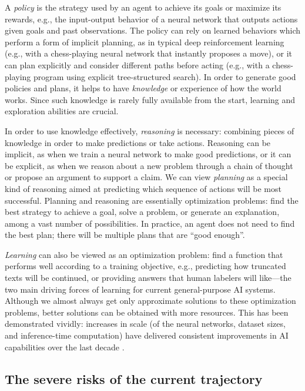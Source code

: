 A \textit{policy} is the strategy used by an agent to achieve its goals or maximize its rewards, e.g., the input-output behavior of a neural network that outputs actions given goals and past observations. The policy can rely on learned behaviors which perform a form of implicit planning, as in typical deep reinforcement learning \cite{mitpress.mit.edu.9780262039246.reinforcement.learning} (e.g., with a chess-playing neural network that instantly proposes a move), or it can plan explicitly and consider different paths before acting \cite{aima.cs.berkeley.edu} (e.g., with a chess-playing program using explicit tree-structured search). In order to generate good policies and plans, it helps to have \emph{knowledge} or experience of how the world works. Since such knowledge is rarely fully available from the start, learning and exploration abilities are crucial.

In order to use knowledge effectively, \emph{reasoning} is necessary: combining pieces of knowledge in order to make predictions or take actions. Reasoning can be implicit, as when we train a neural network to make good predictions, or it can be explicit, as when we reason about a new problem through a chain of thought or propose an argument to support a claim. We can view \textit{planning} as a special kind of reasoning aimed at predicting which sequence of actions will be most successful. Planning and reasoning are essentially optimization problems: find the best strategy to achieve a goal, solve a problem, or generate an explanation, among a vast number of possibilities. In practice, an agent does not need to find the best plan; there will be multiple plans that are ``good enough''.

\textit{Learning} can also be viewed as an optimization problem: find a function that performs well according to a training objective, e.g., predicting how truncated texts will be continued, or providing answers that human labelers will like---the two main driving forces of learning for current general-purpose AI systems. Although we almost always get only approximate solutions to these optimization problems, better solutions can be obtained with more resources. This has been demonstrated vividly: increases in scale (of the neural networks, dataset sizes, and inference-time computation) have delivered consistent improvements in AI capabilities over the last decade \cite{arxiv.org.abs.2001.08361,arxiv.org.abs.2203.15556,www.gov.uk.government.publications.international.ai.safety.report.2025}.


\subsection{The severe risks of the current trajectory}
\label{sec:existential:riskseverity}

